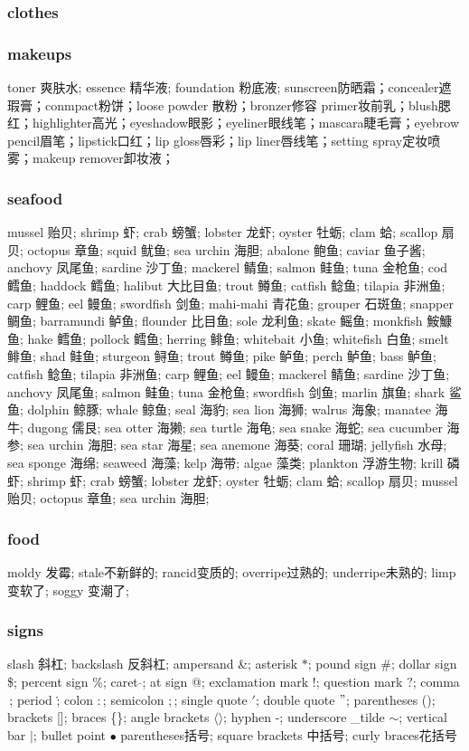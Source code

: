 \documentclass[a4paper,12pt]{article}
\begin{document}
\subsubsection{clothes}
\subsubsection{makeups}
toner 爽肤水; essence 精华液; foundation 粉底液; sunscreen防晒霜；concealer遮瑕膏；conmpact粉饼；loose powder 散粉；bronzer修容
primer妆前乳；blush腮红；highlighter高光；eyeshadow眼影；eyeliner眼线笔；mascara睫毛膏；eyebrow pencil眉笔；lipstick口红；lip gloss唇彩；lip liner唇线笔；setting spray定妆喷雾；makeup remover卸妆液；
\subsubsection{seafood}
mussel 贻贝; shrimp 虾; crab 螃蟹; lobster 龙虾; oyster 牡蛎; clam 蛤; scallop 扇贝; octopus 章鱼; squid 鱿鱼; sea urchin 海胆; abalone 鲍鱼; caviar 鱼子酱; anchovy 凤尾鱼; sardine 沙丁鱼; mackerel 鲭鱼; salmon 鲑鱼; tuna 金枪鱼; cod 鳕鱼; haddock 鳕鱼; halibut 大比目鱼; trout 鳟鱼; catfish 鲶鱼; tilapia 非洲鱼; carp 鲤鱼; eel 鳗鱼; swordfish 剑鱼; mahi-mahi 青花鱼; grouper 石斑鱼; snapper 鲷鱼; barramundi 鲈鱼; flounder 比目鱼; sole 龙利鱼; skate 鳐鱼; monkfish 鮟鱇鱼; hake 鳕鱼; pollock 鳕鱼; herring 鲱鱼; whitebait 小鱼; whitefish 白鱼; smelt 鲱鱼; shad 鲑鱼; sturgeon 鲟鱼; trout 鳟鱼; pike 鲈鱼; perch 鲈鱼; bass 鲈鱼; catfish 鲶鱼; tilapia 非洲鱼; carp 鲤鱼; eel 鳗鱼; mackerel 鲭鱼; sardine 沙丁鱼; anchovy 凤尾鱼; salmon 鲑鱼; tuna 金枪鱼; swordfish 剑鱼; marlin 旗鱼; shark 鲨鱼; dolphin 鲸豚; whale 鲸鱼; seal 海豹; sea lion 海狮; walrus 海象; manatee 海牛; dugong 儒艮; sea otter 海獭; sea turtle 海龟; sea snake 海蛇; sea cucumber 海参; sea urchin 海胆; sea star 海星; sea anemone 海葵; coral 珊瑚; jellyfish 水母; sea sponge 海绵; seaweed 海藻; kelp 海带; algae 藻类; plankton 浮游生物; krill 磷虾; shrimp 虾; crab 螃蟹; lobster 龙虾; oyster 牡蛎; clam 蛤; scallop 扇贝; mussel 贻贝; octopus 章鱼; sea urchin 海胆; 
\subsubsection{food}
moldy 发霉; stale不新鲜的; rancid变质的; overripe过熟的; underripe未熟的; limp变软了; soggy 变潮了;
\subsubsection{signs}
slash 斜杠; backslash 反斜杠; ampersand \&; asterisk \(*\); pound sign \#; dollar sign \$; percent sign \%; caret \(\hat{}\); at sign @; exclamation mark \(!\); question mark \(?\); comma \,; period \.; colon \(:\); semicolon \(; \); single quote \('\); double quote \("\); parentheses (); brackets []; braces \{\}; angle brackets \(\langle \rangle\); hyphen -; underscore \_tilde \(\sim\); vertical bar \(\vert\); bullet point \(\bullet\) parentheses括号; square brackets 中括号; curly braces花括号
 
\end{document}
